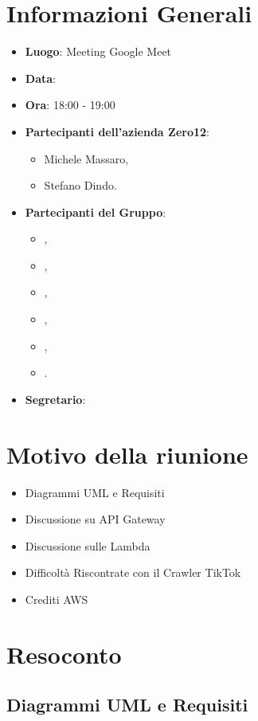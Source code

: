 \section{Informazioni Generali}

\begin{itemize}
\item{\textbf{Luogo}}: Meeting Google Meet
\item{\textbf{Data}}: \D{}
\item{\textbf{Ora}}: 18:00 - 19:00
\item{\textbf{Partecipanti dell'azienda Zero12}}: 
	\begin{itemize}
	\item{Michele Massaro,} 
	\item{Stefano Dindo.}
	\end{itemize} 
\item{\textbf{Partecipanti del Gruppo}}: 
	\begin{itemize}
	\item{\EP{},} 
	\item{\FP{},}
	\item{\GC{},}
	\item{\LW{},}	
	\item{\MB{},}
	\item{\PV{}.}
	\end{itemize} 
\item{\textbf{Segretario}}: \GC{}
\end{itemize}

\section{Motivo della riunione}
\begin{itemize}
\item{Diagrammi UML e Requisiti}
\item{Discussione su API Gateway}
\item{Discussione sulle Lambda}
\item{Difficoltà Riscontrate con il Crawler TikTok}
\item{Crediti AWS}
\end{itemize}

\section{Resoconto}

\subsection{Diagrammi UML e Requisiti}

